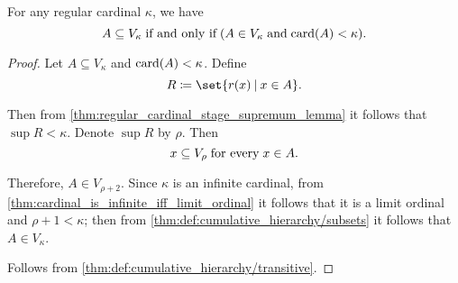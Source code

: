 \begin{proposition}\label{thm:regular_cardinal_stage_inverse_transitivity}
  For any regular cardinal \( \kappa \), we have
  \begin{equation*}
    A \subseteq V_\kappa \T{if and only if} (A \in V_\kappa \T{and} \card(A) < \kappa).
  \end{equation*}
\end{proposition}
\begin{proof}
  \SufficiencySubProof Let \( A \subseteq V_\kappa \) and \( \operatorname{card}(A) < \kappa \). Define
  \begin{equation*}
    R \coloneqq \set{ r(x) \given x \in A }.
  \end{equation*}

  Then from \cref{thm:regular_cardinal_stage_supremum_lemma} it follows that \( \sup R < \kappa \). Denote \( \sup R \) by \( \rho \). Then
  \begin{equation*}
    x \subseteq V_\rho \T{for every} x \in A.
  \end{equation*}

  Therefore, \( A \in V_{\rho + 2} \). Since \( \kappa \) is an infinite cardinal, from \cref{thm:cardinal_is_infinite_iff_limit_ordinal} it follows that it is a limit ordinal and \( \rho + 1 < \kappa \); then from \cref{thm:def:cumulative_hierarchy/subsets} it follows that \( A \in V_\kappa \).

  \NecessitySubProof Follows from \cref{thm:def:cumulative_hierarchy/transitive}.
\end{proof}

